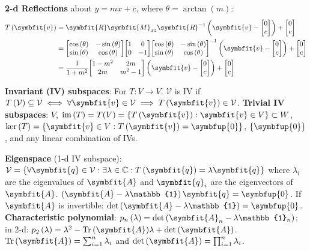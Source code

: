 \documentclass{article}
\begin{document}
\noindent \textbf{2-d Reflections} about $y=mx + c$, where $\theta=\arctan{\left( m \right)}$:
\begin{align*}
	T\left( \symbfit{v} \right) &= \symbfit{R} \symbfit{M}_{xz} \symbfit{R}^{-1} \left( \symbfit{v} - \mqty[0 \\ c] \right) + \mqty[0 \\ c] \\
	&= \mqty[\cos{\left( \theta \right)} & -\sin{\left( \theta \right)} \\ \sin{\left( \theta \right)} & \cos{\left( \theta \right)}] \mqty[1 & 0 \\ 0 & -1] \mqty[\cos{\left( \theta \right)} & -\sin{\left( \theta \right)} \\ \sin{\left( \theta \right)} & \cos{\left( \theta \right)}]^{-1} \left( \symbfit{v} - \mqty[0 \\ c] \right) + \mqty[0 \\ c] \\
	&= \frac{1}{1+m^2}\mqty[1-m^2 & 2m \\ 2m & m^2-1] \left( \symbfit{v} - \mqty[0 \\ c] \right) + \mqty[0 \\ c]
\end{align*}

\noindent \textbf{Invariant (IV) subspaces}: 
For $T:V\rightarrow V$. $\mathcal{V}$ is IV if 
$T\left(\mathcal{V}\right)\subseteq \mathcal{V}\iff\forall \symbfit{v}
\in \mathcal{V}\implies T\left(\symbfit{v}\right)\in \mathcal{V}$. 
\textbf{Trivial IV subspaces}: $V$, 
$\vim{\left( T \right)} = T(V) = \left\{ T\left(\symbfit{v}\right) : 
\symbfit{v}\in V \right\} \subset W$, 
$\vker{\left( T \right)} = \left\{ \symbfit{v}\in V : 
T\left(\symbfit{v}\right) = \symbfup{0} \right\}$, 
$\left\{ \symbfup{0} \right\}$, and any linear combination of IVs.

\noindent \textbf{Eigenspace} (1-d IV subspace): 
$\mathcal{V} = \left\{ \forall \symbfit{q}\in \mathcal{V}:\exists 
\lambda \in \mathbb{C}:T\left(\symbfit{q}\right) = \lambda \symbfit{q} \right\}$ 
where $\lambda_i$ are the eigenvalues of $\symbfit{A}$ and 
$\symbfit{q}_i$ are the eigenvectors of $\symbfit{A}$. 
$\left( \symbfit{A} - \lambda \mathbb{1} \right) \symbfit{q}=\symbfup{0}$. 
If $\symbfit{A}$ is invertible: 
$\det{\left( \symbfit{A} - \lambda\mathbb{1} \right)} = \symbfup{0}$. 
\textbf{Characteristic polynomial}: 
$p_n\left(\lambda\right) = \det{\left( \symbfit{A}_n - \lambda\mathbb{1}_n \right)}$; 
in 2-d: $p_2\left(\lambda\right) = \lambda^2-\tr{\left( \symbfit{A} \right)}\lambda + \det{\left( \symbfit{A} \right)}$. 
$\tr{\left( \symbfit{A} \right)} = \sum_{i=1}^n \lambda_i$ and 
$\det{\left( \symbfit{A} \right)} = \prod_{i=1}^n \lambda_i$. 
\end{document}
